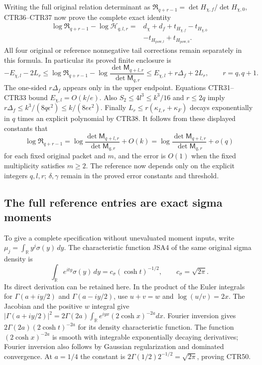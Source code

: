 Writing the full original relation determinant as
$\mathfrak R_{q+r-1}=\det H_{\chi,f}/\det H_{\chi,0}$,
CTR36--CTR37 now prove the complete exact identity
\[
 \begin{split}
 \log\mathfrak R_{q+r-1}-\log\mathcal H_{q,l,r}
   ={}&d_\chi+d_f
       +t_{H_{\chi,f}}-t_{H_{\chi,0}}\\
      &-t_{H_{\mathrm{pow},l}}+t_{H_{\mathrm{pow},0}} .
 \end{split}
 \tag{CTR47}
\]
All four original or reference nonnegative tail corrections remain
separately in this formula. In particular its proved finite enclosure is
\[
 \boxed{
 -E_{\chi,l}-2L_r
 \leq\log\mathfrak R_{q+r-1}
       -\log\frac{\det\mathsf M_{q+l,r}}{\det\mathsf M_{q,r}}
 \leq E_{\chi,l}+r\Delta_f+2L_r,\qquad r=q,q+1.}
 \tag{CTR48}
\]
The one-sided $r\Delta_f$ appears only in the upper endpoint.
Equations CTR31--CTR33 bound $E_{\chi,l}=O(k/e)$.
Also $S_2\leq4l^3\leq k^3/16$ and $r\leq2q$ imply
$r\Delta_f\leq k^3/(8q\epsilon^2)\leq k/(8e\epsilon^2)$.
Finally $L_r\leq r(\kappa_{I,r}+\kappa_F)$ decays exponentially
in $q$ times an explicit polynomial by CTR38.
It follows from these displayed constants that
\[
 \log\mathfrak R_{q+r-1}
   =\log\frac{\det\mathsf M_{q+l,r}}{\det\mathsf M_{q,r}}
       +O(k)=
     \log\frac{\det\mathsf M_{q+l,r}}{\det\mathsf M_{q,r}}+o(q)
 \tag{CTR49}
\]
for each fixed original packet and $m$, and the error is $O(1)$
when the fixed multiplicity satisfies $m\geq2$.
The reference now depends only on the explicit integers $q,l,r$;
$\delta,\gamma$ remain in the proved error constants and threshold.

\subsection{The full reference entries are exact sigma moments}
To give a complete specification without unevaluated moment inputs,
write $\mu_j=\int_{\mathbb R}y^j\sigma(y)\,dy$.
The characteristic function JSA4 of the same original sigma density is
\[
 \int_{\mathbb R}e^{ity}\sigma(y)\,dy
    =c_\sigma(\cosh t)^{-1/2},\qquad c_\sigma=\sqrt{2\pi}.
 \tag{CTR50}
\]
Its direct derivation can be retained here. In the product of the Euler
integrals for $\Gamma(a+iy/2)$ and $\Gamma(a-iy/2)$, use
$u+v=w$ and $\log(u/v)=2x$. The Jacobian and the positive $w$ integral
give
$|\Gamma(a+iy/2)|^2
=2\Gamma(2a)\int_{\mathbb R}e^{iyx}(2\cosh x)^{-2a}dx$.
Fourier inversion gives
$2\Gamma(2a)(2\cosh t)^{-2a}$ for its density characteristic function.
The function $(2\cosh x)^{-2a}$ is smooth with integrable exponentially
decaying derivatives; Fourier inversion also follows by Gaussian
regularization and dominated convergence. At $a=1/4$ the constant is
$2\Gamma(1/2)2^{-1/2}=\sqrt{2\pi}$, proving CTR50.

